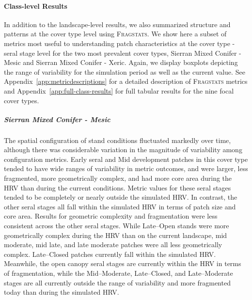 



\clearpage


\paragraph{Class-level Results}

In addition to the landscape-level results, we also summarized structure and patterns at the cover type level using \textsc{Fragstats}. We show here a subset of metrics most useful to understanding patch characteristics at the cover type - seral stage level for the two most prevalent cover types, Sierran Mixed Conifer - Mesic and Sierran Mixed Conifer - Xeric. Again, we display boxplots depicting the range of variability for the simulation period as well as the current value. See Appendix~\ref{app:metricdescriptions} for a detailed description of \textsc{Fragstats} metrics and Appendix~\ref{app:full-class-results} for full tabular results for the nine focal cover types.


\subparagraph{Sierran Mixed Conifer - Mesic} %
The spatial configuration of stand conditions fluctuated markedly over time, although there was considerable variation in the magnitude of variability among configuration metrics. Early seral and Mid development patches in this cover type tended to have wide ranges of variability in metric outcomes, and were larger, less fragmented, more geometrically complex, and had more core area during the HRV than during the current conditions. Metric values for these seral stages tended to be completely or nearly outside the simulated HRV. 
In contrast, the other seral stages all fall within the simulated HRV in terms of patch size and core area. Results for geometric complexity and fragmentation were less consistent across the other seral stages. While Late--Open stands were more geometrically complex during the HRV than on the current landscape, mid moderate, mid late, and late moderate patches were all less geometrically complex. Late--Closed patches currently fall within the simulated HRV. Meanwhile, the open canopy seral stages are currently within the HRV in terms of fragmentation, while the Mid--Moderate, Late--Closed, and Late--Moderate stages are all currently outside the range of variability and more fragmented today than during the simulated HRV.  

